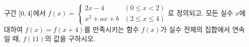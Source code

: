 구간 $[0{,}\mkern3mu\mathopen{}4]$에서 $f(x)=\begin{cases} 2x-4 & (0\le x<2) \\ x^2+ax+b & (2\le x\le 4) \end{cases}$로 정의되고, 모든 실수 $x$에 대하여 $f(x)=f(x+4)$를 만족시키는 함수 $f(x)$가 실수 전체의 집합에서 연속일 때, $f(11)$의 값을 구하시오. 
